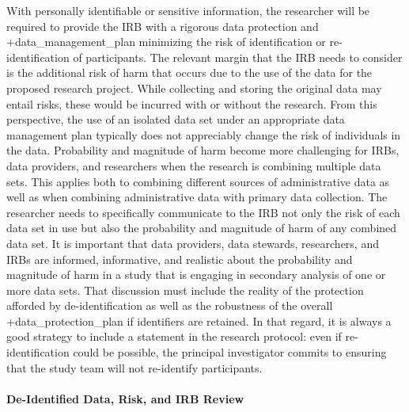 \documentclass[
]{book}
\begin{document}
With personally identifiable or sensitive information, the researcher will be required to provide the IRB with a rigorous data protection and +data\_management\_plan\textbar{} minimizing the risk of identification or re-identification of participants. The relevant margin that the IRB needs to consider is the additional risk of harm that occurs due to the use of the data for the proposed research project. While collecting and storing the original data may entail risks, these would be incurred with or without the research. From this perspective, the use of an isolated data set under an appropriate data management plan typically does not appreciably change the risk of individuals in the data. Probability and magnitude of harm become more challenging for IRBs, data providers, and researchers when the research is combining multiple data sets. This applies both to combining different sources of administrative data as well as when combining administrative data with primary data collection. The researcher needs to specifically communicate to the IRB not only the risk of each data set in use but also the probability and magnitude of harm of any combined data set. It is important that data providers, data stewards, researchers, and IRBs are informed, informative, and realistic about the probability and magnitude of harm in a study that is engaging in secondary analysis of one or more data sets. That discussion must include the reality of the protection afforded by de-identification as well as the robustness of the overall +data\_protection\_plan\textbar{} if identifiers are retained. In that regard, it is always a good strategy to include a statement in the research protocol: even if re-identification could be possible, the principal investigator commits to ensuring that the study team will not re-identify participants.

\hypertarget{de-identified-data-risk-and-irb-review}{%
\paragraph{De-Identified Data, Risk, and IRB Review}\label{de-identified-data-risk-and-irb-review}}
\end{document}
